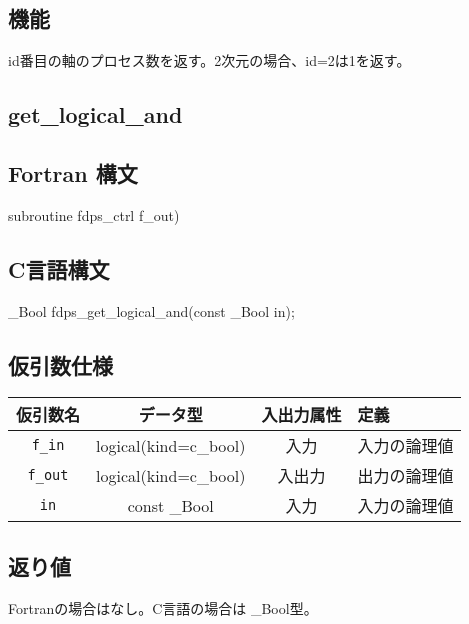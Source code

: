 \subsection*{機能}
id番目の軸のプロセス数を返す。2次元の場合、id=2は1を返す。
\clearpage

\subsection{get\_logical\_and}
\subsection*{Fortran 構文}
\begin{screen}
\begin{spverbatim}
subroutine fdps_ctrl%
                                     f_out)
\end{spverbatim}
\end{screen}

\subsection*{C言語構文}
\begin{screen}
\begin{spverbatim}
_Bool fdps_get_logical_and(const _Bool in);
\end{spverbatim}
\end{screen}

\subsection*{仮引数仕様}
\begin{table}[h]
\begin{tabularx}{\linewidth}{cccX}
\toprule
\rowcolor{Snow2}
仮引数名 & データ型 & 入出力属性 & 定義 \\
\midrule
\verb|f_in| & logical(kind=c\_bool) & 入力 & 入力の論理値\\
\verb|f_out| & logical(kind=c\_bool) & 入出力 & 出力の論理値\\
\verb|in| & const \_Bool & 入力 & 入力の論理値\\
\bottomrule
\end{tabularx}
\end{table}

\subsection*{返り値}
Fortranの場合はなし。C言語の場合は \_Bool型。


